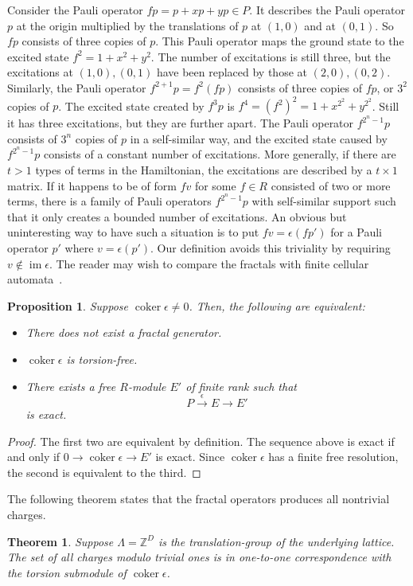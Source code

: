 \documentclass[letterpaper,12pt]{amsart}
\newtheorem{theorem}{Theorem}
\newtheorem{prop}[lem]{Proposition}
\theoremstyle{definition} \newtheorem{defn}{Definition}
\theoremstyle{definition} \newtheorem{rem}{Remark}
\theoremstyle{definition} \newtheorem{example}{Example}
\newcommand{\im}{\mathop{\mathrm{im}}}
\newcommand{\coker}{\mathop{\mathrm{coker}}}
\begin{document}
Consider the Pauli operator $fp = p + x p + y p \in P$. 
It describes the Pauli operator $p$ at the origin 
multiplied by the translations of $p$ at $(1,0)$ and at $(0,1)$.
So $fp$ consists of three copies of $p$.
This Pauli operator maps the ground state to the excited state $f^2 = 1 + x^2 + y^2$.
The number of excitations is still three, but the excitations at $(1,0), (0,1)$ 
have been replaced by those at $(2,0),(0,2)$.
Similarly, the Pauli operator $f^{2+1} p = f^2 (fp)$ 
consists of three copies of $fp$, or $3^2$ copies of $p$.
The excited state created by $f^3 p$ is $f^4 = (f^2)^2 = 1 + x^{2^2} + y^{2^2}$.
Still it has three excitations, but they are further apart.
The Pauli operator $f^{2^n -1} p$ consists of $3^n$ copies of $p$ in a self-similar way,
and the excited state caused by $f^{2^n -1} p$ consists of a constant number of excitations.
%
More generally, if there are $t > 1$ types of terms in the Hamiltonian,
the excitations are described by a $t \times 1$ matrix.
If it happens to be of form $f v$ for some $f \in R$ consisted of two or more terms,
there is a family of Pauli operators $f^{2^n -1} p$ with self-similar support
such that it only creates a bounded number of excitations.
An obvious but uninteresting way to have such a situation is to put
$f v = \epsilon (f p')$ for a Pauli operator $p'$ where $v = \epsilon( p' )$.
Our definition avoids this triviality by requiring $v \notin \im \epsilon$.
The reader may wish to compare the fractals with finite cellular automata~\cite{MartinOdlyzkoAndrewWolfram1984}.

\begin{prop}
\cite[16.33]{BrunsVetter}
Suppose $\coker \epsilon \ne 0$.
Then, the following are equivalent:
\begin{itemize}
 \item There does not exist a fractal generator.
 \item $\coker \epsilon$ is torsion-free.
 \item There exists a free $R$-module $E'$ of finite rank such that
\[
 P \xrightarrow{\epsilon} E \to E'
\]
is exact.
\label{prop:nofractal-torsionless}
\end{itemize}
\end{prop}
\begin{proof}
The first two are equivalent by definition.
The sequence above is exact if and only if
$ 0 \to \coker{\epsilon} \to E' $
is exact.
Since $\coker \epsilon$ has a finite free resolution,
the second is equivalent to the third.
\end{proof}
The following theorem states that the fractal operators produces all nontrivial charges.
\begin{theorem}
Suppose $\Lambda = \mathbb{Z}^D$ is the translation-group of the underlying lattice.
The set of all charges modulo trivial ones is in one-to-one correspondence
with the torsion submodule of $\coker \epsilon$.
\label{thm:charge-equals-torsion}
\end{theorem}
\end{document}
